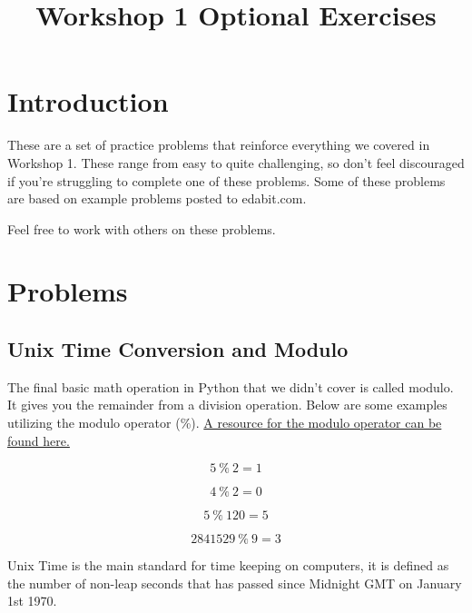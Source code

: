 \documentclass[12pt]{article}
\title{Workshop 1 Optional Exercises}
\author{}
\date{}
\begin{document}
\maketitle

\section{Introduction}

These are a set of practice problems that reinforce everything we covered in Workshop 1. These range from easy to quite challenging, so don't feel discouraged if you're struggling to complete one of these problems. Some of these problems are based on example problems posted to edabit.com.

Feel free to work with others on these problems.

\section{Problems}

\subsection{Unix Time Conversion and Modulo}

The final basic math operation in Python that we didn't cover is called modulo. It gives you the remainder from a division operation. Below are some examples utilizing the modulo operator (\%). \href{https://realpython.com/python-modulo-operator/#python-modulo-operator-basics}{A resource for the modulo operator can be found here.}

\begin{equation*}
    5\: \%\: 2 = 1
\end{equation*}

\begin{equation*}
    4\: \%\: 2 = 0
\end{equation*}

\begin{equation*}
    5\: \%\: 120 = 5
\end{equation*}

\begin{equation*}
    2841529\: \%\: 9 = 3
\end{equation*}

Unix Time is the main standard for time keeping on computers, it is defined as the number of non-leap seconds that has passed since Midnight GMT on January 1st 1970.
\end{document}
